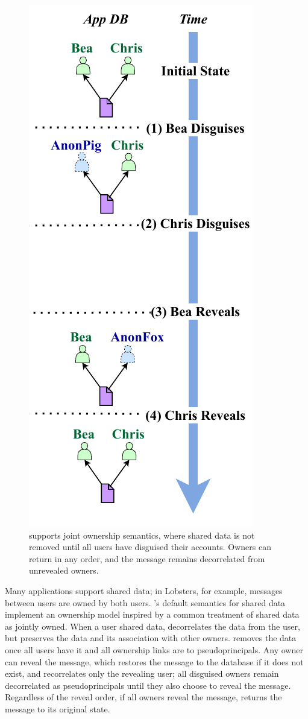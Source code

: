 \begin{figure}
    \centering
    \includegraphics[width=.4\textwidth]{figs/shared_hl}
    \caption[\sys supports joint ownership semantics when disguising shared data.]{\sys supports joint ownership semantics, where shared data is not
    removed until all users have disguised their accounts. Owners can return in
    any order, and the message remains decorrelated from unrevealed owners.}
\label{f:shared:hl}
\end{figure}


%
Many applications support shared data; in Lobsters, for example, messages
between users are owned by both users.
%
\sys's default semantics for shared data implement an ownership model inspired
by a common treatment of shared data as jointly owned.
%
When a user \xxs shared data, \sys decorrelates the data from the \xxing user,
but preserves the data and its association with other owners.
%
\sys removes the data once all users have \xxed it and all ownership links are
to pseudoprincipals.
%
Any owner can reveal the message, which restores the message to the database if
it does not exist, and recorrelates only the revealing user; all disguised
owners remain decorrelated as pseudoprincipals until they also choose to reveal the message.
%
Regardless of the reveal order, if all owners reveal the message, \sys returns
the message to its original state.

